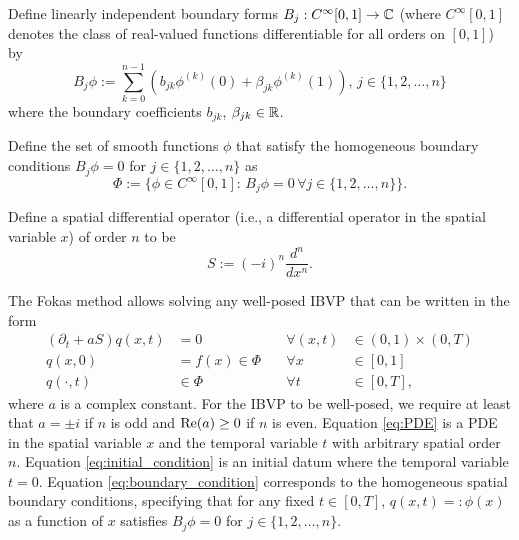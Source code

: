 \documentclass[12pt, oneside, a4paper]{article}
\begin{document}
Define linearly independent boundary forms $B_j: C^\infty[0,1]\to \mathbb C$ (where $C^\infty[0,1]$ denotes the class of real-valued functions differentiable for all orders on $[0,1]$) by
\begin{equation}\label{eq:B_j}
    B_j\phi := \sum_{k=0}^{n-1}\left(b_{jk}\phi^{(k)}(0) + \beta_{jk}\phi^{(k)}(1)\right),\, j\in\{1,2,\ldots,n\}
\end{equation}
where the boundary coefficients $b_{jk}$, $\beta_{jk}\in\mathbb R$. 

Define the set of smooth functions $\phi$ that satisfy the homogeneous boundary conditions $B_j\phi=0$ for $j\in\{1,2,\ldots,n\}$ as
\begin{equation}\label{eq:Phi}
    \Phi:=\{\phi\in C^\infty[0,1]:\, B_j\phi = 0\,\forall j\in\{1,2,\ldots,n\}\}.
\end{equation}

Define a spatial differential operator (i.e., a differential operator in the spatial variable $x$) of order $n$ to be
\begin{equation}\label{eq:S}
    S := (-i)^n \frac{d^n}{dx^n}.
\end{equation}

The Fokas method allows solving any well-posed IBVP that can be written in the form
\begin{subequations}\label{eq:IBVP}
    \begin{alignat}{3}
        (\partial_t + aS)q(x,t) &= 0\quad &\forall (x,t)&\in (0,1)\times (0,T) \label{eq:PDE}\\
        q(x,0) &= f(x)\in \Phi\quad &\forall x&\in [0,1]\label{eq:initial_condition}\\
        q(\cdot, t) &\in \Phi \quad &\forall t&\in [0,T],\label{eq:boundary_condition}
    \end{alignat}
\end{subequations}
where $a$ is a complex constant. For the IBVP to be well-posed, we require at least that $a=\pm i$ if $n$ is odd and $\mathrm{Re}(a)\geq 0$ if $n$ is even. Equation \eqref{eq:PDE} is a PDE in the spatial variable $x$ and the temporal variable $t$ with arbitrary spatial order $n$.
Equation \eqref{eq:initial_condition} is an initial datum where the temporal variable $t=0$. Equation \eqref{eq:boundary_condition} corresponds to the homogeneous spatial boundary conditions, specifying that for any fixed $t\in [0,T]$, $q(x,t)=:\phi(x)$ as a function of $x$ satisfies $B_j\phi=0$ for $j\in \{1,2,\ldots,n\}$.
\end{document}
